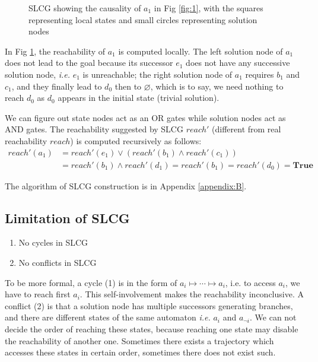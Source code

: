 \documentclass[runningheads]{llncs}
\begin{document}
\begin{figure}[!ht]
\centering

\caption{SLCG showing the causality of $a_1$ in Fig \ref{fig:1}, with the squares representing local states and small circles representing solution nodes}
\label{fig:2}
\end{figure}
In Fig \ref{fig:2}, the reachability of $a_1$ is computed locally. 
The left solution node of $a_1$ does not lead to the goal because its successor $e_1$ does not have any successive solution node, \textit{i.e.} $e_1$ is unreachable;
the right solution node of $a_1$ requires $b_1$ and $c_1$, and they finally lead to $d_0$ then to $\varnothing$, which is to say, we need nothing to reach $d_0$ as $d_0$ appears in the initial state (trivial solution).

We can figure out state nodes act as an OR gates while solution nodes act as AND gates. The reachability suggested by SLCG $reach'$ (different from real reachability $reach$) is computed recursively as follows:
\begin{align*}
reach'(a_1)&=reach'(e_1)\lor (reach'(b_1)\land reach'(c_1))\\
&=reach'(b_1)\land reach'(d_1)=reach'(b_1)=reach'(d_0)=\mathbf{True}
\end{align*}

The algorithm of SLCG construction is in Appendix \ref{appendix:B}.


\subsection{Limitation of SLCG}\label{limitation}

\begin{enumerate}
\item No cycles in SLCG
\item No conflicts in SLCG

\end{enumerate}
To be more formal, a cycle (1) is in the form of $a_i\mapsto\cdots\mapsto a_i$, i.e. to access $a_i$, we have to reach first $a_i$. This self-involvement makes the reachability inconclusive. 
A conflict (2) is that a solution node has multiple successors generating branches, and there are different states of the same automaton \textit{i.e.} $a_i$ and $a_{\lnot i}$. 
We can not decide the order of reaching these states, because reaching one state may disable the reachability of another one.
Sometimes there exists a trajectory which accesses these states in certain order, sometimes there does not exist such.
\end{document}
